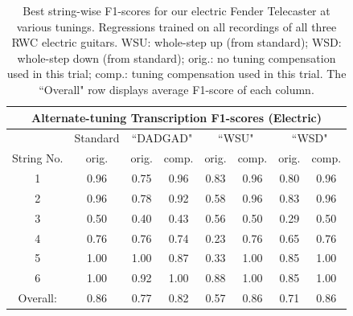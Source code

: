 \documentclass[12pt]{cmuthesis}
\begin{document}
\begin{table}[!htbp]
\begin{center}
\begin{tabular}{||c||c||c|c||c|c||c|c||}
\hline
\multicolumn{8}{|c|}{\bf{Alternate-tuning Transcription F1-scores (Electric)}} \\
\hline
& Standard & \multicolumn{2}{|c|}{``DADGAD"} & \multicolumn{2}{|c|}{``WSU"} & \multicolumn{2}{|c|}{``WSD"} \\
\hline
String No. & orig. & orig. & comp. & orig. & comp. & orig. & comp. \\
\hline
1 & 0.96 & 0.75 & 0.96 & 0.83 & 0.96 & 0.80 & 0.96 \\
\hline
2 & 0.96 & 0.78 & 0.92 & 0.58 & 0.96 & 0.83 & 0.96\\
\hline
3 & 0.50 & 0.40 & 0.43 & 0.56 & 0.50 & 0.29 & 0.50\\
\hline
4 & 0.76 & 0.76 & 0.74 & 0.23 & 0.76 & 0.65 & 0.76 \\
\hline
5 & 1.00 & 1.00 & 0.87 & 0.33 & 1.00 & 0.85 & 1.00 \\
\hline
6 & 1.00 & 0.92 & 1.00 & 0.88 & 1.00 & 0.85 & 1.00\\ 
\hline
\hline
Overall: & 0.86 & 0.77 & 0.82 & 0.57 & 0.86 & 0.71 & 0.86\\
\hline
\end{tabular}
\caption{Best string-wise F1-scores for our electric Fender Telecaster at various tunings. Regressions trained on all recordings of all three RWC electric guitars. WSU: whole-step up (from standard); WSD: whole-step down (from standard); orig.: no tuning compensation used in this trial; comp.: tuning compensation used in this trial. The ``Overall" row displays average F1-score of each column.} 
\label{tab:resultsTune}
\end{center}
\end{table}
\end{document}
